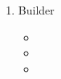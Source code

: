\documentclass[a4paper,10pt]{article}
\begin{document}
\begin{enumerate}
\begin{enumerate}
            \item \colorbox[rgb]{0.69, 0.61, 0.85}{Builder}
            \begin{itemize}
                \item [\Checkmark]
                
                \item [\Checkmark]


                \item [\XSolidBrush ] 
            \end{itemize}
            
        \end{enumerate}
        
       
        
                 

\end{enumerate}
\end{document}
